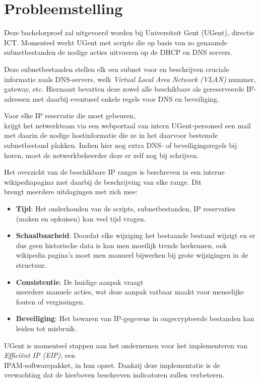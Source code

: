 \documentclass{hogent-article}
\begin{document}
\section{Probleemstelling}
\label{sec:probleemstelling}
Deze bachelorproef zal uitgevoerd worden bij Universiteit Gent (UGent), directie ICT. Momenteel werkt UGent met scripts die op basis van zo genaamde subnetbestanden de nodige acties uitvoeren op de DHCP en DNS servers. 

Deze subnetbestanden stellen elk een subnet voor en beschrijven cruciale informatie zoals DNS-servers, welk \textit{Virtual Local Area Network (VLAN)} nummer, gateway, etc. Hiernaast bevatten deze zowel alle beschikbare als gereserveerde IP-adressen met daarbij eventueel enkele regels voor DNS en beveiliging.

Voor elke IP reservatie die moet gebeuren, \\krijgt het netwerkteam via een webportaal van intern UGent-personeel een mail met daarin de nodige hostinformatie die ze in het daarvoor bestemde subnetbestand plakken. Indien hier nog extra DNS- of beveiligingsregels bij horen, moet de netwerkbeheerder deze er zelf nog bij schrijven.

Het overzicht van de beschikbare IP ranges is beschreven in een interne wikipediapagina met daarbij de beschrijving van elke range. Dit \\brengt meerdere uitdagingen met zich mee:
\begin{itemize}
    \item \textbf{Tijd}: Het onderhouden van de scripts, subnetbestanden, IP reservaties (maken en opkuisen) kan veel tijd vragen.
    \item \textbf{Schaalbaarheid}: Doordat elke wijziging het bestaande bestand wijzigt en er dus geen historische data is kan men moeilijk trends herkennen, ook wikipedia pagina's moet men manueel bijwerken bij grote wijzigingen in de structuur.
    \item \textbf{Consistentie}: De huidige aanpak vraagt \\meerdere manuele acties, wat deze aanpak vatbaar maakt voor menselijke fouten of vergissingen.  
    \item \textbf{Beveiliging}: Het bewaren van IP-gegevens in ongecrypteerde bestanden kan leiden tot misbruik.
\end{itemize}

UGent is momenteel stappen aan het ondernemen voor het implementeren van \textit{Efficiënt IP (EIP)}, een \\IPAM-softwarepakket, in hun opzet. Dankzij deze implementatie is de verwachting dat de hierboven beschreven indicatoren zullen verbeteren.
\end{document}
